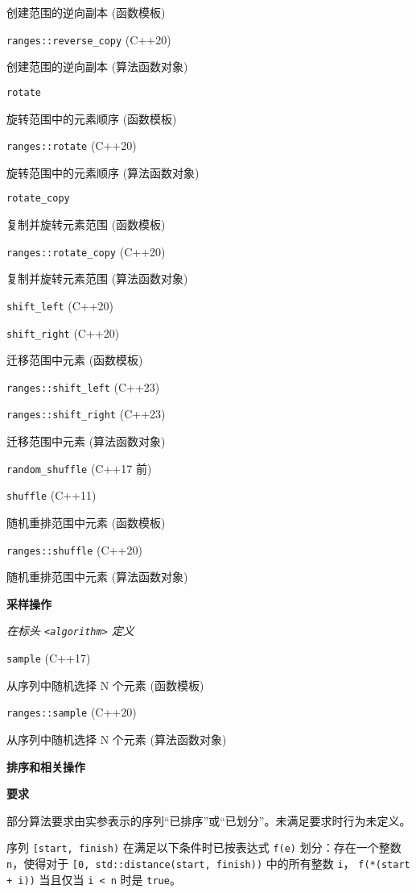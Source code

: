 创建范围的逆向副本 (函数模板)

\noindent \lstinline{ranges::reverse_copy} (C++20) 

创建范围的逆向副本 (算法函数对象)

\noindent \lstinline{rotate} 

旋转范围中的元素顺序 (函数模板)

\noindent \lstinline{ranges::rotate} (C++20)

旋转范围中的元素顺序 (算法函数对象)

\noindent \lstinline{rotate_copy}

复制并旋转元素范围 (函数模板)

\noindent \lstinline{ranges::rotate_copy} (C++20)

复制并旋转元素范围 (算法函数对象)

\noindent \lstinline{shift_left} (C++20)

\noindent \lstinline{shift_right} (C++20) 

迁移范围中元素 (函数模板)

\noindent \lstinline{ranges::shift_left} (C++23)

\noindent \lstinline{ranges::shift_right} (C++23)

迁移范围中元素 (算法函数对象)

\noindent \lstinline{random_shuffle} (C++17 前)

\noindent \lstinline{shuffle} (C++11)

随机重排范围中元素 (函数模板)

\noindent \lstinline{ranges::shuffle} (C++20)

随机重排范围中元素 (算法函数对象)

\noindent \textbf{采样操作}

\textit{在标头 \lstinline{<algorithm>} 定义}

\noindent \lstinline{sample} (C++17)

从序列中随机选择 N 个元素 (函数模板)

\noindent \lstinline{ranges::sample} (C++20)

从序列中随机选择 N 个元素 (算法函数对象)

\textbf{排序和相关操作}

\noindent \textbf{要求}

部分算法要求由实参表示的序列“已排序”或“已划分”。未满⾜要求时⾏为未定义。

序列 \lstinline{[start, finish)} 在满⾜以下条件时已按表达式 \lstinline{f(e)} 划分：存在⼀个整数 \lstinline{n}，使得对于 \lstinline{[0, std::distance(start, finish))} 中的所有整数 \lstinline{i}， \lstinline{f(*(start + i))} 当且仅当 \lstinline{i < n} 时是 \lstinline{true}。


